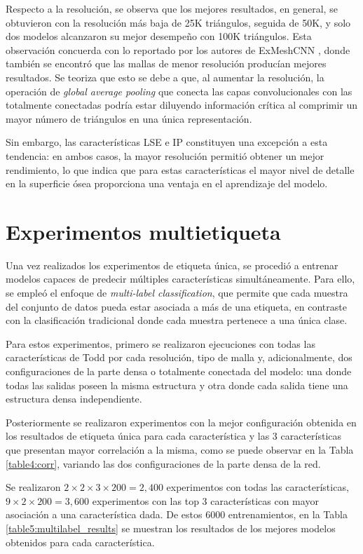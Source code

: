 Respecto a la resolución, se observa que los mejores resultados, en general, se obtuvieron con la resolución más baja de 25K triángulos, seguida de 50K, y solo dos modelos alcanzaron su mejor desempeño con 100K triángulos. Esta observación concuerda con lo reportado por los autores de ExMeshCNN \cite{kim_exmeshcnn_2022}, donde también se encontró que las mallas de menor resolución producían mejores resultados. Se teoriza que esto se debe a que, al aumentar la resolución, la operación de \textit{global average pooling} que conecta las capas convolucionales con las totalmente conectadas podría estar diluyendo información crítica al comprimir un mayor número de triángulos en una única representación.

Sin embargo, las características LSE e IP constituyen una excepción a esta tendencia: en ambos casos, la mayor resolución permitió obtener un mejor rendimiento, lo que indica que para estas características el mayor nivel de detalle en la superficie ósea proporciona una ventaja en el aprendizaje del modelo.

\section{Experimentos multietiqueta}
Una vez realizados los experimentos de etiqueta única, se procedió a entrenar modelos capaces de predecir múltiples características simultáneamente. Para ello, se empleó el enfoque de \textit{multi-label classification}, que permite que cada muestra del conjunto de datos pueda estar asociada a más de una etiqueta, en contraste con la clasificación tradicional donde cada muestra pertenece a una única clase.

Para estos experimentos, primero se realizaron ejecuciones con todas las características de Todd por cada resolución, tipo de malla y, adicionalmente, dos configuraciones de la parte densa o totalmente conectada del modelo: una donde todas las salidas poseen la misma estructura y otra donde cada salida tiene una estructura densa independiente.

Posteriormente se realizaron experimentos con la mejor configuración obtenida en los resultados de etiqueta única para cada característica y las 3 características que presentan mayor correlación a la misma, como se puede observar en la Tabla \ref{table4:corr}, variando las dos configuraciones de la parte densa de la red.

Se realizaron $2 \times 2 \times 3 \times 200 = 2,400$ experimentos con todas las características, $9 \times 2 \times 200 = 3,600$ experimentos con las top 3 características con mayor asociación a una característica dada. De estos 6000 entrenamientos, en la Tabla \ref{table5:multilabel_results} se muestran los resultados de los mejores modelos obtenidos para cada característica.

